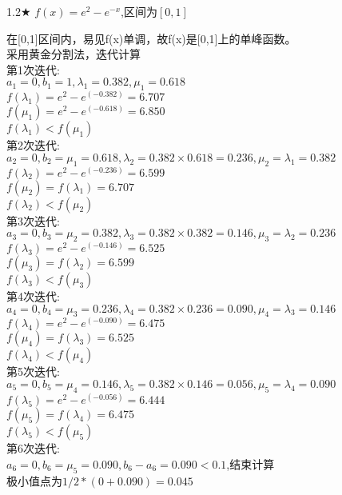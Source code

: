 \begin{problem}{1.2$\bigstar$}
    $f(x)=e^2-e^{-x}$,区间为$[0,1]$
\end{problem}
\begin{solution}
    在[0,1]区间内，易见f(x)单调，故f(x)是[0,1]上的单峰函数。\\
    采用黄金分割法，迭代计算\\
    第1次迭代:\\
    $a_1=0,b_1=1,\lambda_1=0.382,\mu_1=0.618$\\
    $f(\lambda_1)=e^2-e^{(-0.382)}=6.707$\\
    $f(\mu_1)=e^2-e^{(-0.618)}=6.850$\\
    $f(\lambda_1)<f(\mu_1)$\\
    第2次迭代:\\
    $a_2=0,b_2=\mu_1=0.618,\lambda_2=0.382\times0.618=0.236,\mu_2=\lambda_1=0.382$\\
    $f(\lambda_2)=e^2-e^{(-0.236)}=6.599$\\
    $f(\mu_2)=f(\lambda_1)=6.707$\\
    $f(\lambda_2)<f(\mu_2)$\\
    第3次迭代:\\
    $a_3=0,b_3=\mu_2=0.382,\lambda_3=0.382\times0.382=0.146,\mu_3=\lambda_2=0.236$\\
    $f(\lambda_3)=e^2-e^{(-0.146)}=6.525$\\
    $f(\mu_3)=f(\lambda_2)=6.599$\\
    $f(\lambda_3)<f(\mu_3)$\\
    第4次迭代:\\
    $a_4=0,b_4=\mu_3=0.236,\lambda_4=0.382\times0.236=0.090,\mu_4=\lambda_3=0.146$\\
    $f(\lambda_4)=e^2-e^{(-0.090)}=6.475$\\
    $f(\mu_4)=f(\lambda_3)=6.525$\\
    $f(\lambda_4)<f(\mu_4)$\\
    第5次迭代:\\
    $a_5=0,b_5=\mu_4=0.146,\lambda_5=0.382\times0.146=0.056,\mu_5=\lambda_4=0.090$\\
    $f(\lambda_5)=e^2-e^{(-0.056)}=6.444$\\
    $f(\mu_5)=f(\lambda_4)=6.475$\\
    $f(\lambda_5)<f(\mu_5)$\\
    第6次迭代:\\
    $a_6=0,b_6=\mu_5=0.090,b_6-a_6=0.090<0.1$,结束计算\\
    极小值点为$1/2*(0+0.090)=0.045$\\

\end{solution}
